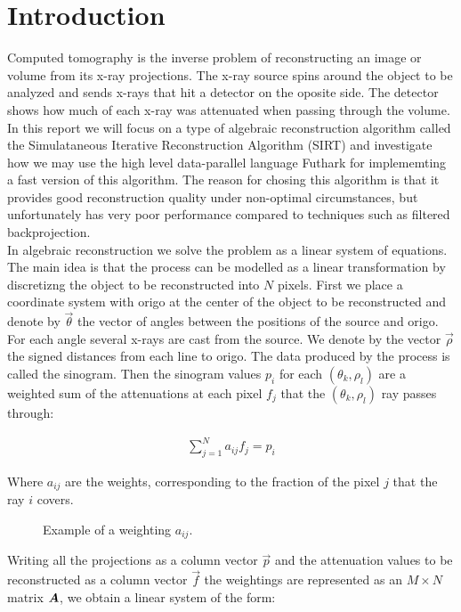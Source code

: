 \section{Introduction}
Computed tomography is the inverse problem of reconstructing an image or volume from its x-ray projections. The x-ray source spins around the object to be analyzed and sends x-rays that hit a detector on the oposite side. The detector shows how much of each x-ray was attenuated when passing through the volume. In this report we will focus on a type of algebraic reconstruction algorithm called the Simulataneous Iterative Reconstruction Algorithm (SIRT) and investigate how we may use the high level data-parallel language Futhark for implememting a fast version of this algorithm. The reason for chosing this algorithm is that it provides good reconstruction quality under non-optimal circumstances, but unfortunately has very poor performance compared to techniques such as filtered backprojection.\\
In algebraic reconstruction we solve the problem as a linear system of equations. The main idea is that the process can be modelled as a linear transformation by discretizng the object to be reconstructed into $N$ pixels. First we place a coordinate system with origo at the center of the object to be reconstructed and denote by $\vec{\theta}$ the vector of angles between the positions of the source and origo. For each angle several x-rays are cast from the source. We denote by the vector $\vec{\rho}$ the signed distances from each line to origo. The data produced by the process is called the sinogram. Then the sinogram values $p_i$ for each $(\theta_k,\rho_l)$  are a weighted sum of the attenuations at each pixel $f_j$ that the $(\theta_k,\rho_l)$ ray passes through:

\begin{align}
\sum_{j=1}^N a_{ij}f_j=p_i
\end{align}

Where $a_{ij}$ are the weights, corresponding to the fraction of the pixel $j$ that the ray $i$ covers.

\begin{figure}
\centering
{}
\caption{Example of a weighting $a_{ij}$.}
\label{fig:weightings}
\end{figure}
Writing all the projections as a column vector $\vec{p}$ and the attenuation values to be reconstructed as a column vector $\vec{f}$ the weightings are represented as an $M\times N$ matrix $\mat{A}$, we obtain a linear system of the form:

